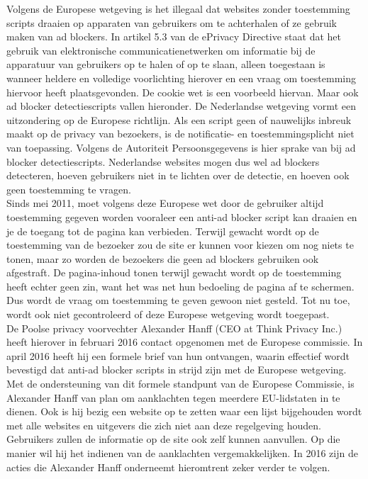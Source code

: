 \documentclass[pdftex,a4paper,12pt,twoside]{report}
\begin{document}
Volgens de Europese wetgeving is het illegaal dat websites zonder toestemming scripts draaien op apparaten van gebruikers om te achterhalen of ze gebruik maken van ad blockers. 
In artikel 5.3 van de ePrivacy Directive staat dat het gebruik van elektronische communicatienetwerken om informatie bij de apparatuur van gebruikers op te halen of op te slaan, alleen toegestaan is wanneer heldere en volledige voorlichting hierover en een vraag om toestemming hiervoor heeft plaatsgevonden. 
De cookie wet is een voorbeeld hiervan. Maar ook ad blocker detectiescripts vallen hieronder. De Nederlandse wetgeving vormt een uitzondering op de Europese richtlijn. Als een script geen of nauwelijks inbreuk maakt op de privacy van bezoekers, is de notificatie- en toestemmingsplicht niet van toepassing. Volgens de Autoriteit Persoonsgegevens is hier sprake van bij ad blocker detectiescripts. Nederlandse websites mogen dus wel ad blockers detecteren, hoeven gebruikers niet in te lichten over de detectie, en hoeven ook geen toestemming te vragen. 
\\
Sinds mei 2011, moet volgens deze Europese wet door de gebruiker altijd toestemming gegeven worden vooraleer een anti-ad blocker script kan draaien en je de toegang tot de pagina kan verbieden. Terwijl gewacht wordt op de toestemming van de bezoeker zou de site er kunnen voor kiezen om nog niets te tonen, maar zo worden de bezoekers die geen ad blockers gebruiken ook afgestraft. De pagina-inhoud tonen terwijl gewacht wordt op de toestemming heeft echter geen zin, want het was net hun bedoeling de pagina af te schermen. Dus wordt de vraag om toestemming te geven gewoon niet gesteld. Tot nu toe, wordt ook niet gecontroleerd of deze Europese wetgeving wordt toegepast.
\\
De Poolse privacy voorvechter Alexander Hanff (CEO at Think Privacy Inc.) heeft hierover in februari 2016 contact opgenomen met de Europese commissie. In april 2016 heeft hij een formele brief van hun ontvangen, waarin effectief wordt bevestigd dat anti-ad blocker scripts in strijd zijn met de Europese wetgeving. 
Met de ondersteuning van dit formele standpunt van de Europese Commissie, is Alexander Hanff van plan om aanklachten tegen meerdere EU-lidstaten in te dienen. Ook is hij bezig een website op te zetten waar een lijst bijgehouden wordt met alle websites en uitgevers die zich niet aan deze regelgeving houden. Gebruikers zullen de informatie op de site ook zelf kunnen aanvullen. Op die manier wil hij het indienen van de aanklachten vergemakkelijken.
In 2016 zijn de acties die Alexander Hanff onderneemt hieromtrent zeker verder te volgen.
\end{document}

